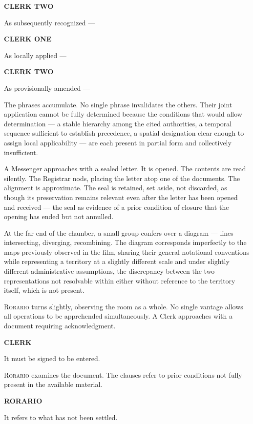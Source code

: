 \documentclass[12pt, oneside]{article}
\newenvironment{action}{%
  \vspace{0.6em}%
  \noindent\ignorespaces%
}{%
  \par\vspace{0.6em}%
}
\newcommand{\character}[1]{%
  \vspace{0.8em}%
  \begin{center}%
    \bfseries\MakeUppercase{#1}%
  \end{center}%
  \vspace{-0.3em}%
}
\newenvironment{dialogue}{%
  \vspace{0.2em}%
  \begin{list}{}{%
    \setlength{\leftmargin}{1.2in}%
    \setlength{\rightmargin}{0.8in}%
    \setlength{\itemsep}{0.6em}%
    \setlength{\parsep}{0pt}%
  }%
}{%
  \end{list}%
  \vspace{0.4em}%
}
\newcommand{\says}[2]{%
  \character{#1}%
  \begin{dialogue}\item #2\end{dialogue}%
}
\begin{document}
\says{Clerk Two}{As subsequently recognized ---}

\says{Clerk One}{As locally applied ---}

\says{Clerk Two}{As provisionally amended ---}

\begin{action}
The phrases accumulate. No single phrase invalidates the others. Their joint application cannot be fully determined because the conditions that would allow determination --- a stable hierarchy among the cited authorities, a temporal sequence sufficient to establish precedence, a spatial designation clear enough to assign local applicability --- are each present in partial form and collectively insufficient.

A Messenger approaches with a sealed letter. It is opened. The contents are read silently. The Registrar nods, placing the letter atop one of the documents. The alignment is approximate. The seal is retained, set aside, not discarded, as though its preservation remains relevant even after the letter has been opened and received --- the seal as evidence of a prior condition of closure that the opening has ended but not annulled.

At the far end of the chamber, a small group confers over a diagram --- lines intersecting, diverging, recombining. The diagram corresponds imperfectly to the maps previously observed in the film, sharing their general notational conventions while representing a territory at a slightly different scale and under slightly different administrative assumptions, the discrepancy between the two representations not resolvable within either without reference to the territory itself, which is not present.
\end{action}

\begin{action}
\textsc{Rorario} turns slightly, observing the room as a whole. No single vantage allows all operations to be apprehended simultaneously. A Clerk approaches with a document requiring acknowledgment.
\end{action}

\says{Clerk}{It must be signed to be entered.}

\begin{action}
\textsc{Rorario} examines the document. The clauses refer to prior conditions not fully present in the available material.
\end{action}

\says{Rorario}{It refers to what has not been settled.}
\end{document}

